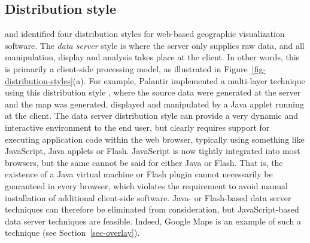 \documentclass[acmnow]{acmtrans2m}
\begin{document}
\subsection{Distribution style}
\label{sec-distribution}

 and  identified four
distribution styles for web-based geographic visualization software. The
\emph{data server} style is where the server only supplies raw data, and
all manipulation, display and analysis takes place at the client. In
other words, this is primarily a client-side processing model, as
illustrated in Figure~\ref{fig-distribution-styles}(a). For example,
Palantir implemented a multi-layer technique using this distribution
style \cite{Papa-N-1998-Palantir}, where the source data were generated
at the server and the map was generated, displayed and manipulated by a
Java applet running at the client. The data server distribution style
can provide a very dynamic and interactive environment to the end user,
but clearly requires support for executing application code within the
web browser, typically using something like JavaScript, Java applets or
Flash. JavaScript is now tightly integrated into most browsers, but the
same cannot be said for either Java or Flash. That is, the existence of
a Java virtual machine or Flash plugin cannot necessarily be guaranteed
in every browser, which violates the requirement to avoid manual
installation of additional client-side software. Java- or Flash-based
data server techniques can therefore be eliminated from consideration,
but JavaScript-based data server techniques are feasible. Indeed, Google
Maps is an example of such a technique (see Section~\ref{sec-overlay}).
\end{document}
